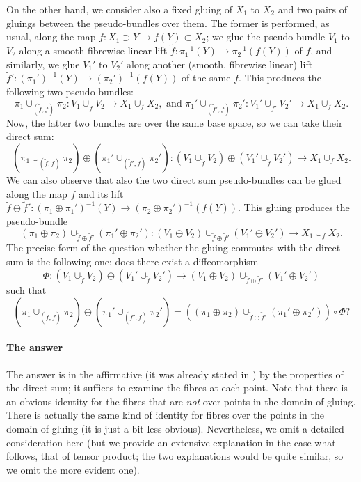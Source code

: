 \documentclass{article}
\begin{document}
On the other hand, we consider also a fixed gluing of $X_1$ to $X_2$ and two pairs of gluings between the pseudo-bundles over them. The former is performed, as usual, along the map 
$f:X_1\supset Y\to f(Y)\subset X_2$; we glue the pseudo-bundle $V_1$ to $V_2$ along a smooth fibrewise linear lift $\tilde{f}:\pi_1^{-1}(Y)\to\pi_2^{-1}(f(Y))$ of $f$, and similarly, we glue $V_1'$ to $V_2'$ 
along another (smooth, fibrewise linear) lift $\tilde{f}':(\pi_1')^{-1}(Y)\to(\pi_2')^{-1}(f(Y))$ of the same $f$. This produces the following two pseudo-bundles:
$$\pi_1\cup_{(\tilde{f},f)}\pi_2:V_1\cup_{\tilde{f}}V_2\to X_1\cup_f X_2,\mbox{ and }\pi_1'\cup_{(\tilde{f}',f)}\pi_2':V_1'\cup_{\tilde{f}'}V_2'\to X_1\cup_f X_2.$$ Now, the latter two bundles are over the same base
space, so we can take their direct sum:
$$(\pi_1\cup_{(\tilde{f},f)}\pi_2)\oplus(\pi_1'\cup_{(\tilde{f}',f)}\pi_2'):(V_1\cup_{\tilde{f}}V_2)\oplus(V_1'\cup_{\tilde{f}}V_2')\to X_1\cup_f X_2.$$ We can also observe that also the two direct sum
pseudo-bundles can be glued along the map $f$ and its lift $\tilde{f}\oplus\tilde{f}':(\pi_1\oplus\pi_1')^{-1}(Y)\to(\pi_2\oplus\pi_2')^{-1}(f(Y))$. This gluing produces the pseudo-bundle
$$(\pi_1\oplus\pi_2)\cup_{\tilde{f}\oplus\tilde{f}'}(\pi_1'\oplus\pi_2'):(V_1\oplus V_2)\cup_{\tilde{f}\oplus\tilde{f}'}(V_1'\oplus V_2')\to X_1\cup_f X_2.$$ The precise form of the question whether the gluing
commutes with the direct sum is the following one: does there exist a diffeomorphism
$$\Phi:(V_1\cup_{\tilde{f}}V_2)\oplus(V_1'\cup_{\tilde{f}}V_2')\to(V_1\oplus V_2)\cup_{\tilde{f}\oplus\tilde{f}'}(V_1'\oplus V_2')$$ such that
$$(\pi_1\cup_{(\tilde{f},f)}\pi_2)\oplus(\pi_1'\cup_{(\tilde{f}',f)}\pi_2')=\left((\pi_1\oplus\pi_2)\cup_{\tilde{f}\oplus\tilde{f}'}(\pi_1'\oplus\pi_2')\right)\circ\Phi?$$

\paragraph{The answer} The answer is in the affirmative (it was already stated in \cite{pseudobundles}) by the properties of the direct sum; it suffices to examine the fibres at each point. Note that there is
an obvious identity for the fibres that are \emph{not} over points in the domain of gluing. There is actually the same kind of identity for fibres over the points in the domain of gluing (it is just a bit less obvious). 
Nevertheless, we omit a detailed consideration here (but we provide an extensive explanation in the case what follows, that of tensor product; the two explanations would be quite similar, so we omit the more 
evident one).
\end{document}
